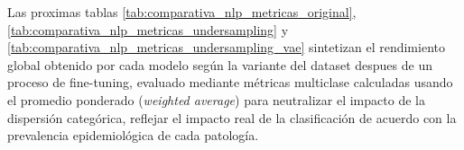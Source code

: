\documentclass[12pt,a4paper,onecolumn,oneside]{report}
\begin{document}
Las proximas tablas \ref{tab:comparativa_nlp_metricas_original}, \ref{tab:comparativa_nlp_metricas_undersampling} y \ref{tab:comparativa_nlp_metricas_undersampling_vae} sintetizan el rendimiento global obtenido por cada modelo según la variante del dataset despues de un proceso de fine-tuning, evaluado mediante métricas multiclase calculadas usando el promedio ponderado (\textit{weighted average}) para neutralizar el impacto de la dispersión categórica, reflejar el impacto real de la clasificación de acuerdo con la prevalencia epidemiológica de cada patología.

\end{document}
